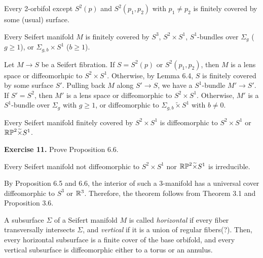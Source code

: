 \documentclass{../../../small}
\begin{document}
\begin{lem}
Every 2-orbifol except $S^2(p)$ and $S^2(p_1,p_2)$ with $p_1\ne p_2$ is finitely covered by some (usual) surface.
\end{lem}

\begin{prop}
Every Seifert manifold $M$ is finitely covered by $S^3$, $S^2\times S^1$, $S^1$-bundles over $\Sigma_g$ ($g\ge1$), or $\Sigma_{g,b}\times S^1$ ($b\ge1$).
\end{prop}
\begin{pf}
Let $M\to S$ be a Seifert fibration.
If $S=S^2(p)$ or $S^2(p_1,p_2)$, then $M$ is a lens space or diffeomorhpic to $S^2\times S^1$.
Otherwise, by Lemma 6.4, $S$ is finitely covered by some surface $S'$.
Pulling back $M$ along $S'\to S$, we have a $S^1$-bundle $M'\to S'$.
If $S'=S^2$, then $M'$ is a lens space or diffeomorphic to $S^2\times S^1$.
Otherwise, $M'$ is a $S^1$-bundle over $\Sigma_g$ with $g\ge1$, or diffeomorphic to $\Sigma_{g,b}\tilde\times S^1$ with $b\ne0$.
\end{pf}
\begin{prop}
Every Seifert manifold finitely covered by $S^2\times S^1$ is diffeomorphic to $S^2\times S^1$ or $\mathbb{RP}^2\widetilde\times S^1$.
\end{prop}

\noindent\textbf{Exercise 11.} Prove Proposition 6.6.

\begin{thm}
Every Seifert manifold not diffeomorphic to $S^2\times S^1$ nor $\mathbb{RP}^2\widetilde\times S^1$ is irreducible.
\end{thm}
\begin{pf}
By Proposition 6.5 and 6.6, the interior of such a 3-manifold has a universal cover diffeomorphic to $S^3$ or $\mathbb{R}^3$.
Therefore, the theorem follows from Theorem 3.1 and Proposition 3.6.
\end{pf}

A subsurface $\Sigma$ of a Seifert manifold $M$ is called \emph{horizontal} if every fiber transversally intersects $\Sigma$, and \emph{vertical} if it is a union of regular fibers(?).
Then, every horizontal subsurface is a finite cover of the base orbifold, and every vertical subsurface is diffeomorphic either to a torus or an annulus.
\end{document}
